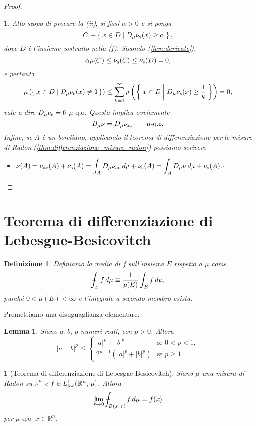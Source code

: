 \documentclass[a4paper,10pt,openright,oneside]{book}
\theoremstyle{theoremstyle}
\newtheorem{lemma}[teorema]{Lemma}
\theoremstyle{theoremstylewoheader}
\newtheorem{teorema2}[teorema]{}
\theoremstyle{theoremstyle}
\newtheorem{definizione}[teorema]{Definizione}
\theoremstyle{proofsecstyle}
\newtheorem{proofsec}{}
\theoremstyle{nonumberplain}
\newtheorem{proof}{Dim.}
\newcommand{\RR}{\ensuremath{\mathbb{R}}}
\newcommand{\Der}[2]{\ensuremath{D_#2 #1}}
\newcommand{\abs}[1]{\ensuremath{\lvert #1 \rvert}}
\newcommand{\qo}[1]{\ensuremath{#1\text{-q.o.}}}
\newcommand{\qogni}[2]{\ensuremath{#2\text{-q.o. $\!#1$}}}
\def\Xint#1{\mathchoice
	{\XXint\displaystyle\textstyle{#1}}%
	{\XXint\textstyle\scriptstyle{#1}}%
	{\XXint\scriptstyle\scriptscriptstyle{#1}}%
	{\XXint\scriptscriptstyle\scriptscriptstyle{#1}}%
	\!\int}
\def\XXint#1#2#3{{\setbox0=\hbox{$#1{#2#3}{\int}$}
	\vcenter{\hbox{$#2#3$}}\kern-.5\wd0}}
\def\dashint{\Xint-}
\renewcommand{\qedsymbol}{\ensuremath{\square}}
\newcommand{\mymath}[2]{\begin{itemize}%
  \item[]\hfill\hbox{}\ensuremath{\displaystyle #1}\hfill\ensuremath{\displaystyle #2}%
  \end{itemize}}
\begin{document}
\begin{proof}
\begin{proofsec}
Allo scopo di provare la (ii), si fissi $\alpha > 0$ e si ponga
\[
C \equiv \Set{ x \in D | \Der{\nu_\textup{s}}{\mu}(x) \ge \alpha },
\]
dove $D$ è l'insieme costruito nella (f). Secondo (\ref{lem:derivate}),
\[
\alpha\mu(C) \le \nu_\textup{s}(C) \le \nu_\textup{s}(D) = 0,
\]
e pertanto
\[
\mu\left(\Set{ x \in D | \Der{\nu_\textup{s}}{\mu}(x) \ne 0 }\right) \le \sum_{k=1}^\infty \mu\left(\Set{ x \in D | \Der{\nu_\textup{s}}{\mu}(x) \ge \frac{1}{k} }\right) = 0,
\]
vale a dire $\Der{\nu_\textup{s}}{\mu} = 0$ $\qo{\mu}$ Questo implica ovviamente
\[
\Der{\nu}{\mu} = \Der{\nu_\textup{ac}}{\mu}\qquad\qo{\mu}
\]
Infine, se $A$ è un boreliano, applicando il teorema di differenziazione per le misure di Radon (\ref{thm:differenziazione_misure_radon}) possiamo scrivere
\mymath{\nu(A) = \nu_\textup{ac}(A) + \nu_\textup{s}(A) = \int_A \Der{\nu_\textup{ac}}{\mu}\, d\mu + \nu_\textup{s}(A) = \int_A \Der{\nu}{\mu}\, d\mu + \nu_\textup{s}(A).}{\qedsymbol}
\end{proofsec}
\end{proof}

\section{Teorema di differenziazione di Lebesgue-Besicovitch}

\begin{definizione}
\label{def:media}
Definiamo la \emph{media} di $f$ sull'insieme $E$ rispetto a $\mu$ come
\[
\dashint_E f\, d\mu \equiv \frac{1}{\mu(E)} \int_E f\, d\mu,
\]
purché $0 < \mu(E) < \infty$ e l'integrale a secondo membro esista.
\end{definizione}

\noindent Premettiamo una disuguaglianza elementare.

\begin{lemma}
\label{lem:p_disuguaglianza}
Siano $a,\, b,\, p$ numeri reali, con $p > 0$. Allora
\[
\abs{a + b}^p \le \begin{cases}
\abs{a}^p + \abs{b}^b & \text{se $0 < p < 1$},\\
2^{p-1}(\abs{a}^p + \abs{b}^p) & \text{se $p \ge 1$}.
\end{cases}
\]
\end{lemma}

\begin{teorema2}[Teorema di differenziazione di Lebesgue-Besicovitch]
\label{thm:lebesgue_besicovitch}
Siano $\mu$ una misura di Radon su $\RR^n$ e $f \in L_\textup{loc}^1(\RR^n,\, \mu)$. Allora
\[
\lim_{r \to 0} \dashint_{B(x,\, r)} f\, d\mu = f(x)
\]
per $\qogni{x \in \RR^n}{\mu}$.
\end{teorema2}
\end{document}
